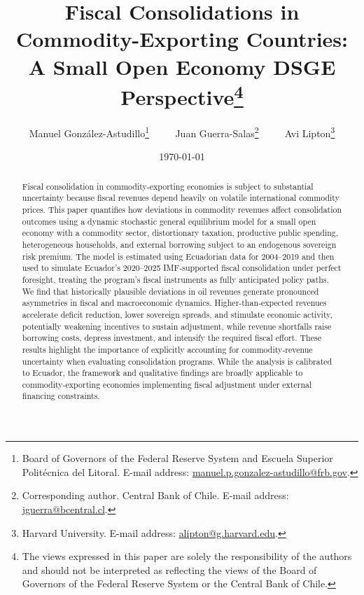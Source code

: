 \documentclass[12pt]{article}
\begin{document}
\title{Fiscal Consolidations in Commodity-Exporting Countries: A Small Open Economy DSGE Perspective\thanks{The views expressed in this paper are solely the responsibility of the authors and should not be interpreted as reflecting the views of the Board of Governors of the Federal Reserve System or the Central Bank of Chile.}}

\author{
Manuel González-Astudillo\thanks{Board of Governors of the Federal Reserve System and Escuela Superior Polit\'ecnica del Litoral. E-mail address: \url{manuel.p.gonzalez-astudillo@frb.gov}.}
$\qquad$
Juan Guerra-Salas\thanks{Corresponding author. Central Bank of Chile. E-mail address: \url{jguerra@bcentral.cl}.}
$\qquad$
Avi Lipton\thanks{Harvard University. E-mail address: \url{alipton@g.harvard.edu}.}
}

\date{\today}
\maketitle

\begin{abstract}
\singlespacing
Fiscal consolidation in commodity‑exporting economies is subject to substantial uncertainty because fiscal revenues depend heavily on volatile international commodity prices. This paper quantifies how deviations in commodity revenues affect consolidation outcomes using a dynamic stochastic general equilibrium model for a small open economy with a commodity sector, distortionary taxation, productive public spending, heterogeneous households, and external borrowing subject to an endogenous sovereign risk premium. The model is estimated using Ecuadorian data for 2004–2019 and then used to simulate Ecuador’s 2020–2025 IMF‑supported fiscal consolidation under perfect foresight, treating the program’s fiscal instruments as fully anticipated policy paths. We find that historically plausible deviations in oil revenues generate pronounced asymmetries in fiscal and macroeconomic dynamics. Higher‑than‑expected revenues accelerate deficit reduction, lower sovereign spreads, and stimulate economic activity, potentially weakening incentives to sustain adjustment, while revenue shortfalls raise borrowing costs, depress investment, and intensify the required fiscal effort. These results highlight the importance of explicitly accounting for commodity‑revenue uncertainty when evaluating consolidation programs. While the analysis is calibrated to Ecuador, the framework and qualitative findings are broadly applicable to commodity‑exporting economies implementing fiscal adjustment under external financing constraints.


\end{abstract}
\end{document}
